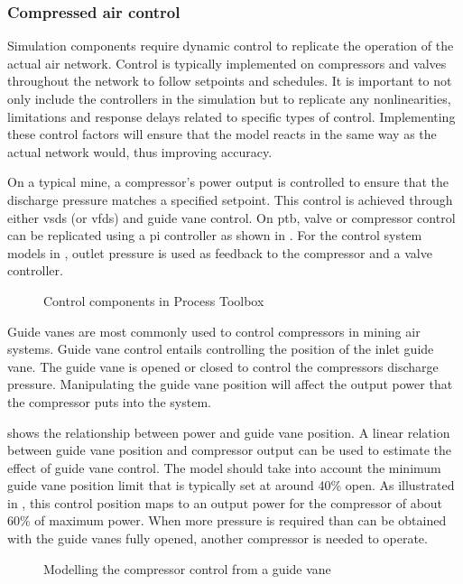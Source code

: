 		\subsubsection{Compressed air control}\label{Controllers}
			Simulation components require dynamic control to replicate the operation of the actual air network. Control is typically implemented on compressors and valves throughout the network to follow setpoints and schedules. It is important to not only include the controllers in the simulation but to replicate any nonlinearities, limitations and response delays related to specific types of control. Implementing these control factors will ensure that the model reacts in the same way as the actual network would, thus improving accuracy.
			\par 
			On a typical mine, a compressor's power output is controlled to ensure that the discharge pressure matches a specified setpoint. This control is achieved through either \glspl{vsd} (or \glspl{vfd}) and guide vane control. On \gls{ptb}, valve or compressor control can be replicated using a \gls{pi} controller as shown in . For the control system models in , outlet pressure is used as feedback to the compressor and a valve controller. 
			\par 
			
	\begin{figure}[h!]
		\centering
		\caption[Control components in Process Toolbox]{Control components in Process Toolbox}
		\label{fig: Controller models}
	\end{figure}
		Guide vanes are most commonly used to control compressors in mining air systems. Guide vane control entails controlling the position of the inlet guide vane. The guide vane is opened or closed to control the compressors discharge pressure. Manipulating the guide vane position will affect the output power that the compressor puts into the system. 
		\par 
		 shows the relationship between power and guide vane position. A linear relation between guide vane position and compressor output can be used to estimate the effect of guide vane control. The model should take into account the minimum guide vane position limit that is typically set at around 40\% open. As illustrated in , this control position maps to an output power for the compressor of about 60\% of maximum power. When more pressure is required than can be obtained with the guide vanes fully opened, another compressor is needed to operate. 
		\begin{figure}[h]
			\centering
			\fbox{}
			\caption{Modelling the compressor control from a guide vane\protect \footnotemark[1]}
			\label{fig: Guide vane position}
		\end{figure}
	
